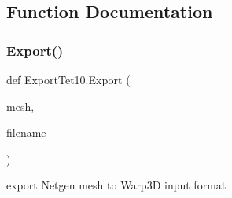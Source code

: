 \subsection{Function Documentation}
\mbox{\label{a00213_ab3114f6532ec029d3077b10ee4da4a72}} 
\subsubsection{\texorpdfstring{Export()}{Export()}}
{\footnotesize\ttfamily def Export\+Tet10.\+Export (\begin{DoxyParamCaption}\item[{}]{mesh,  }\item[{}]{filename }\end{DoxyParamCaption})}

\begin{DoxyVerb}export Netgen mesh to Warp3D input format \end{DoxyVerb}
 